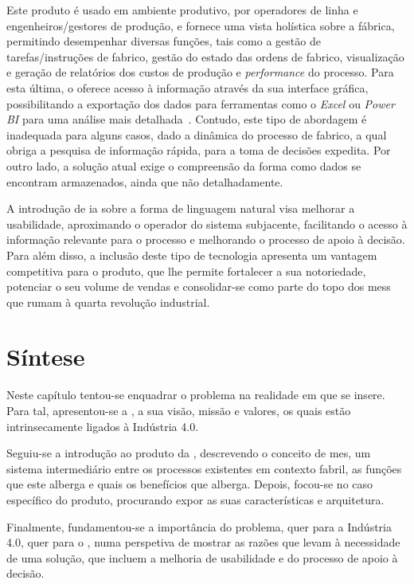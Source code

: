 Este produto é usado em ambiente produtivo, por operadores de linha e engenheiros/gestores de produção, e fornece uma vista holística sobre a fábrica, permitindo desempenhar diversas funções, tais como a gestão de tarefas/instruções de fabrico, gestão do estado das ordens de fabrico, visualização e geração de relatórios dos custos de produção e \textit{performance} do processo. Para esta última, o {\productname} oferece acesso à informação através da sua interface gráfica, possibilitando a exportação dos dados para ferramentas como o \textit{Excel} ou \textit{Power BI} para uma análise mais detalhada~\parencite{cmf_services_bi}. Contudo, este tipo de abordagem é inadequada para alguns casos, dado a dinâmica do processo de fabrico, a qual  obriga a pesquisa de informação rápida, para a toma de decisões expedita. Por outro lado, a solução atual exige o compreensão da forma como dados se encontram armazenados, ainda que não detalhadamente. 

A introdução de \gls{ia} sobre a forma de linguagem natural visa melhorar a usabilidade, aproximando o operador do sistema subjacente, facilitando o acesso à informação relevante para o processo e melhorando o processo de apoio à decisão. Para além disso, a inclusão deste tipo de tecnologia apresenta um vantagem competitiva para o produto, que lhe permite fortalecer a sua notoriedade, potenciar o seu volume de vendas e consolidar-se como parte do topo dos \glspl{mes} que rumam à quarta revolução industrial.

\section{Síntese}
\label{sec:chap02_chaptersummary}
Neste capítulo tentou-se enquadrar o problema na realidade em que se insere. Para tal, apresentou-se a {\companyname}, a sua visão, missão e valores, os quais estão intrinsecamente ligados à Indústria 4.0. 

Seguiu-se a introdução ao produto da {\companyname}, descrevendo o conceito de \gls{mes}, um sistema intermediário entre os processos existentes em contexto fabril, as funções que este alberga e quais os benefícios que alberga. Depois, focou-se no caso específico do produto, procurando expor as suas características e arquitetura.

Finalmente, fundamentou-se a importância do problema, quer para a Indústria 4.0, quer para o {\productname}, numa perspetiva de mostrar as razões que levam à necessidade de uma solução, que incluem a melhoria de usabilidade e do processo de apoio à decisão.